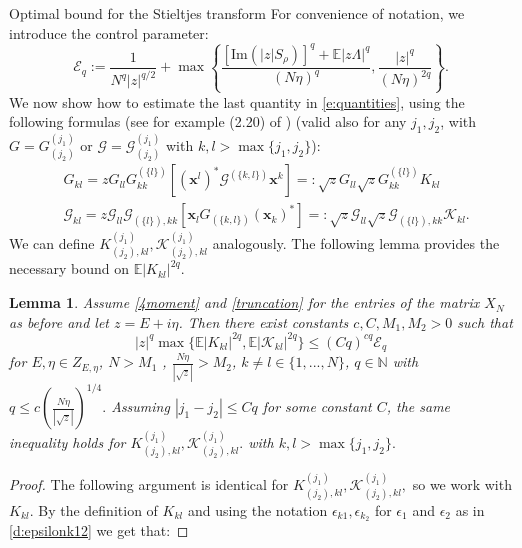 \documentclass[11pt, a4paper, oneside]{book}
\numberwithin{equation}{chapter}
\newcommand{\E}{\mathbb E}
\newtheorem{lem}[thm]{Lemma}
\begin{document}
\begin{section}{Optimal bound for the Stieltjes transform}
For convenience of notation, we introduce the control parameter:
%
\begin{equation}\label{d:controlparam} \mathcal{E}_q := \frac{1}{N^{q} |z|^{q/2}} + \max \left \{\frac{[\mathrm{Im} (|z| S_{\rho} )]^{q} + \E |z \Lambda|^q}{(N\eta)^q} , \frac{|z|^{q}}{(N\eta)^{2q}} \right \}  .
\end{equation}
%
We now show how to estimate the last quantity in \eqref{e:quantities}, using the following formulas (see for example (2.20) of \cite{pillai2014universality} ) (valid also for any $j_1, j_2$, with $G=G^{(j_1)}_{(j_2)}$ or $\mathcal{G}=\mathcal{G}^{(j_1)}_{(j_2)}$ with $k, l > \max \{ j_1 , j_2 \}$):
%
\begin{equation} \label{e:form-off-diag}
\begin{split}
&G_{kl} = 	z G_{ll} G_{kk}^{(\{l\})} \left [ (\mathbf{x}^{l})^* \mathcal{G}^{(\{k, l\}) }\mathbf{x}^{k} \right ] =: \sqrt{z} G_{ll} \sqrt{z} G_{kk}^{(\{l\})} K_{kl}
\\
&\mathcal{G}_{kl} = z \mathcal{G}_{ll} \mathcal{G}_{(\{l\}),kk} \left [ \mathbf{x}_{l} G_{(\{k, l\}) }(\mathbf{x}_{k})^* \right ] =: \sqrt{z}\mathcal{G}_{ll} \sqrt{z} \mathcal{G}_{(\{l\}), kk} \mathcal{K}_{kl} .
\end{split}
\end{equation}
%
We can define $K^{(j_1)}_{(j_2), kl}, \mathcal{K}^{(j_1)}_{(j_2), kl}$ analogously. The following lemma provides the necessary bound on $\E |  K_{kl} |^{2q}$.
%
\begin{lem} \label{off-diag}
Assume \eqref{4moment} and \eqref{truncation} for the entries of the matrix $X_N$ as before and let $z=E+i\eta$. Then there exist constants $c,C,M_1,M_2>0$ such that
%
\begin{equation}\label{e:Kkl}
|z|^q \max\{\E |  K_{kl} |^{2q}, \E |  \mathcal{K}_{kl} |^{2q}\} \leq (Cq)^{cq} \mathcal{E}_q \end{equation}
%
for $E,\eta \in Z_{E,\eta}$, $N>M_1$ , $\frac{N\eta}{|\sqrt{z}|} > M_2$, $k\neq l\in \{1,...,N\}$, $q \in \mathbb{N}$ with $q\leq c \left ( \frac{N\eta}{|\sqrt{z}|} \right )^{1/4}.$ Assuming $|j_1 - j_2| \leq Cq$ for some constant $C$, the same inequality holds for $K^{(j_1)}_{(j_2), kl}, \mathcal{K}^{(j_1)}_{(j_2), kl}.$ with $k,l>\max\{j_1,j_2\}.$
\end{lem}
%
\begin{proof}
The following argument is identical for $K^{(j_1)}_{(j_2), kl}, \mathcal{K}^{(j_1)}_{(j_2), kl},$ so we work with $K_{kl}$. By the definition of  $K_{kl}$ and using the notation $\epsilon_{k1}, \epsilon_{k_2}$ for $\epsilon_1$ and $\epsilon_2$ as in \eqref{d:epsilonk12} we get that:

\end{proof}
\end{section}
\end{document}
